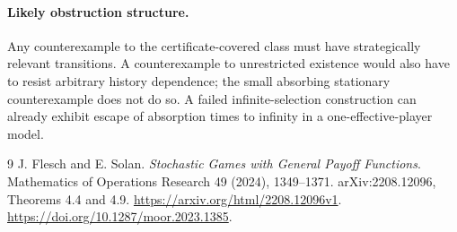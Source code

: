\documentclass[11pt,a4paper]{article}
\theoremstyle{definition}
\theoremstyle{remark}
\begin{document}
\paragraph{Likely obstruction structure.}
Any counterexample to the certificate-covered class must have strategically relevant transitions. A counterexample to unrestricted existence would also have to resist arbitrary history dependence; the small absorbing stationary counterexample does not do so. A failed infinite-selection construction can already exhibit escape of absorption times to infinity in a one-effective-player model.

\begin{thebibliography}{9}
 J. Flesch and E. Solan. \emph{Stochastic Games with General Payoff Functions}. Mathematics of Operations Research 49 (2024), 1349--1371. arXiv:2208.12096, Theorems 4.4 and 4.9. \url{https://arxiv.org/html/2208.12096v1}. \url{https://doi.org/10.1287/moor.2023.1385}.
\end{thebibliography}
\end{document}

